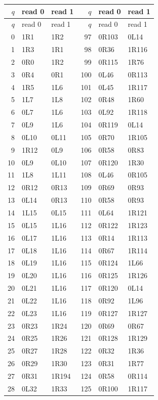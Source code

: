 \begingroup\small
\setlength{\tabcolsep}{7pt}
\begin{longtable}{rll@{\qquad\qquad}rll}
\toprule $q$ & read 0 & read 1 & $q$ & read 0 & read 1\\
\midrule\endfirsthead
\toprule $q$ & read 0 & read 1 & $q$ & read 0 & read 1\\
\midrule\endhead
0 & 1R1 & 1R2 & 97 & 0R103 & 0L14\\
1 & 1R3 & 1R1 & 98 & 0R36 & 1R116\\
2 & 0R0 & 1R2 & 99 & 0R115 & 1R76\\
3 & 0R4 & 0R1 & 100 & 0L46 & 0R113\\
4 & 1R5 & 1L6 & 101 & 0L45 & 1R117\\
5 & 1L7 & 1L8 & 102 & 0R48 & 1R60\\
6 & 0L7 & 1L6 & 103 & 0L92 & 1R118\\
7 & 0L9 & 1L6 & 104 & 0R119 & 0L14\\
8 & 0L10 & 0L11 & 105 & 0R70 & 1R105\\
9 & 1R12 & 0L9 & 106 & 0R58 & 0R83\\
10 & 0L9 & 0L10 & 107 & 0R120 & 1R30\\
11 & 1L8 & 1L11 & 108 & 0L46 & 0R105\\
12 & 0R12 & 0R13 & 109 & 0R69 & 0R93\\
13 & 0L14 & 0R13 & 110 & 0R58 & 0R93\\
14 & 1L15 & 0L15 & 111 & 0L64 & 1R121\\
15 & 0L15 & 1L16 & 112 & 0R122 & 1R123\\
16 & 0L17 & 1L16 & 113 & 0R14 & 1R113\\
17 & 0L18 & 1L16 & 114 & 0R67 & 1R114\\
18 & 0L19 & 1L16 & 115 & 0R124 & 1L66\\
19 & 0L20 & 1L16 & 116 & 0R125 & 1R126\\
20 & 0L21 & 1L16 & 117 & 0R120 & 0L14\\
21 & 0L22 & 1L16 & 118 & 0R92 & 1L96\\
22 & 0L23 & 1L16 & 119 & 0R127 & 1R127\\
23 & 0R23 & 1R24 & 120 & 0R69 & 0R67\\
24 & 0R25 & 1R26 & 121 & 0R128 & 1R129\\
25 & 0R27 & 1R28 & 122 & 0R32 & 1R36\\
26 & 0R29 & 1R30 & 123 & 0R31 & 1R77\\
27 & 0R31 & 1R194 & 124 & 0R58 & 0R114\\
28 & 0L32 & 1R33 & 125 & 0R100 & 1R117\\

\end{longtable}
